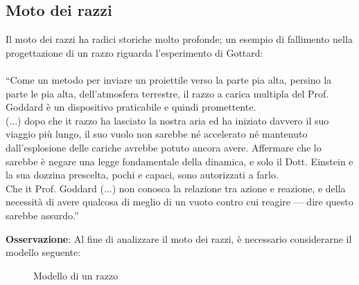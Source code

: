 \documentclass[a4paper]{extarticle}
\newcommand{\quotes}[1]{``#1''}
\begin{document}
\vspace{1em}
\subsection{Moto dei razzi}
Il moto dei razzi ha radici storiche molto profonde; un esempio di fallimento nella progettazione di un razzo riguarda l'esperimento di Gottard:\\\\
\quotes{Come un metodo per inviare un proiettile verso la parte pia alta, persino la parte le pia alta, dell'atmosfera terrestre, il razzo a carica multipla del Prof. Goddard è un dispositivo praticabile e quindi promettente.\\
(...) dopo che it razzo ha lasciato la nostra aria ed ha iniziato davvero il suo viaggio più lungo, il suo vuolo non sarebbe né accelerato né mantenuto dall'esplosione delle cariche avrebbe potuto ancora avere. Affermare che lo sarebbe è negare una legge fondamentale della dinamica, e solo il Dott. Einstein e la sua dozzina prescelta, pochi e capaci, sono autorizzati a farlo.\\
Che it Prof. Goddard (...) non conosca la relazione tra azione e reazione, e della necessità di avere qualcosa di meglio di un vuoto contro cui reagire — dire questo sarebbe assurdo.}

\vspace{1em}
\noindent
\textbf{Osservazione}: Al fine di analizzare il moto dei razzi, è necessario considerarne il modello seguente:

\begin{figure}[H]
  \centering
  \caption{Modello di un razzo}
  \label{fig:modello_razzo}
\end{figure}
\end{document}
